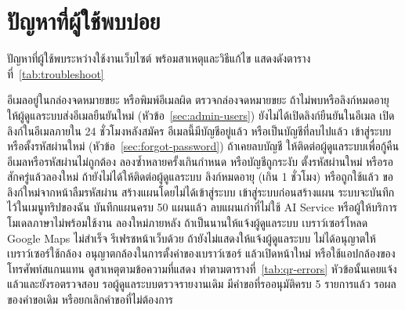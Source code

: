 \label{ch:trouble}

\section{ปัญหาที่ผู้ใช้พบบ่อย}

ปัญหาที่ผู้ใช้พบระหว่างใช้งานเว็บไซต์ พร้อมสาเหตุและวิธีแก้ไข แสดงดังตารางที่~\ref{tab:troubleshoot}

\begin{troubleshooting}
        {อีเมลอยู่ในกล่องจดหมายขยะ หรือพิมพ์อีเมลผิด}
        {ตรวจกล่องจดหมายขยะ ถ้าไม่พบหรือลิงก์หมดอายุ ให้ผู้ดูแลระบบส่งอีเมลยืนยันใหม่ (หัวข้อ~\ref{sec:admin-users})}
        {ยังไม่ได้เปิดลิงก์ยืนยันในอีเมล}
        {เปิดลิงก์ในอีเมลภายใน 24 ชั่วโมงหลังสมัคร}
        {อีเมลนี้มีบัญชีอยู่แล้ว หรือเป็นบัญชีที่ลบไปแล้ว}
        {เข้าสู่ระบบหรือตั้งรหัสผ่านใหม่ (หัวข้อ~\ref{sec:forgot-password}) ถ้าเคยลบบัญชี ให้ติดต่อผู้ดูแลระบบเพื่อกู้คืน}
        {อีเมลหรือรหัสผ่านไม่ถูกต้อง ลองซ้ำหลายครั้งเกินกำหนด หรือบัญชีถูกระงับ}
        {ตั้งรหัสผ่านใหม่ หรือรอสักครู่แล้วลองใหม่ ถ้ายังไม่ได้ให้ติดต่อผู้ดูแลระบบ}
        {ลิงก์หมดอายุ (เกิน 1 ชั่วโมง) หรือถูกใช้แล้ว}
        {ขอลิงก์ใหม่จากหน้าลืมรหัสผ่าน}
        {สร้างแผนโดยไม่ได้เข้าสู่ระบบ}
        {เข้าสู่ระบบก่อนสร้างแผน ระบบจะบันทึกไว้ในเมนูทริปของฉัน}
        {บันทึกแผนครบ 50 แผนแล้ว}
        {ลบแผนเก่าที่ไม่ใช้}
        {AI Service หรือผู้ให้บริการโมเดลภาษาไม่พร้อมใช้งาน}
        {ลองใหม่ภายหลัง ถ้าเป็นนานให้แจ้งผู้ดูแลระบบ}
        {เบราว์เซอร์โหลด Google Maps ไม่สำเร็จ}
        {รีเฟรชหน้าเว็บด้วย  ถ้ายังไม่แสดงให้แจ้งผู้ดูแลระบบ}
        {ไม่ได้อนุญาตให้เบราว์เซอร์ใช้กล้อง}
        {อนุญาตกล้องในการตั้งค่าของเบราว์เซอร์ แล้วเปิดหน้าใหม่ หรือใช้แอปกล้องของโทรศัพท์สแกนแทน}
        {ดูสาเหตุตามข้อความที่แสดง}
        {ทำตามตารางที่~\ref{tab:qr-errors}}
        {หัวข้อนั้นเคยแจ้งแล้วและยังรอตรวจสอบ}
        {รอผู้ดูแลระบบตรวจรายงานเดิม}
        {มีคำขอที่รออนุมัติครบ 5 รายการแล้ว}
        {รอผลของคำขอเดิม หรือยกเลิกคำขอที่ไม่ต้องการ}
\end{troubleshooting}

